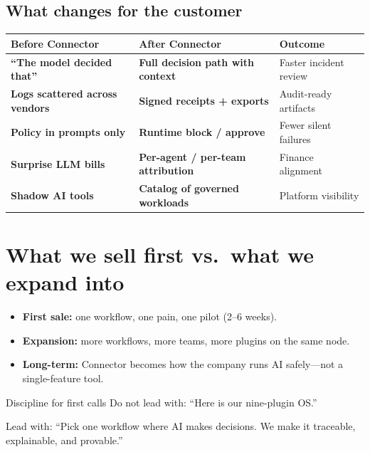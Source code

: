 \subsection{What changes for the customer}

\begin{center}
\renewcommand{\arraystretch}{1.4}
\begin{tabularx}{0.95\textwidth}{@{}>{\bfseries}p{} >{\bfseries}p{} X@{}}
\toprule
\textbf{Before Connector} & \textbf{After Connector} & \textbf{Outcome} \\
\midrule
``The model decided that'' & Full decision path with context & Faster incident review \\
Logs scattered across vendors & Signed receipts + exports & Audit-ready artifacts \\
Policy in prompts only & Runtime block / approve & Fewer silent failures \\
Surprise LLM bills & Per-agent / per-team attribution & Finance alignment \\
Shadow AI tools & Catalog of governed workloads & Platform visibility \\
\bottomrule
\end{tabularx}
\end{center}

\section{What we sell first vs.\ what we expand into}

\begin{itemize}
  \item \textbf{First sale:} one workflow, one pain, one pilot (2--6 weeks).
  \item \textbf{Expansion:} more workflows, more teams, more plugins on the same node.
  \item \textbf{Long-term:} Connector becomes how the company runs AI safely---not a single-feature tool.
\end{itemize}

\begin{insightbox}{Discipline for first calls}
Do not lead with: ``Here is our nine-plugin OS.''

Lead with: ``Pick one workflow where AI makes decisions. We make it traceable, explainable, and provable.''
\end{insightbox}
